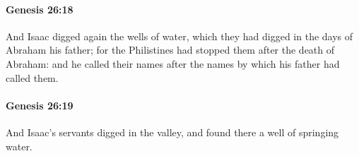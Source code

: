 		\paragraph{Genesis 26:18} %
			\label{GENESIS-26-18}

			And Isaac digged again the wells of water, which they had digged in the days of Abraham his father; for the Philistines had stopped them after the death of Abraham: and he called their names after the names by which his father had called them.


		\paragraph{Genesis 26:19} %
			\label{GENESIS-26-19}

			And Isaac's servants digged in the valley, and found there a well of springing water.


